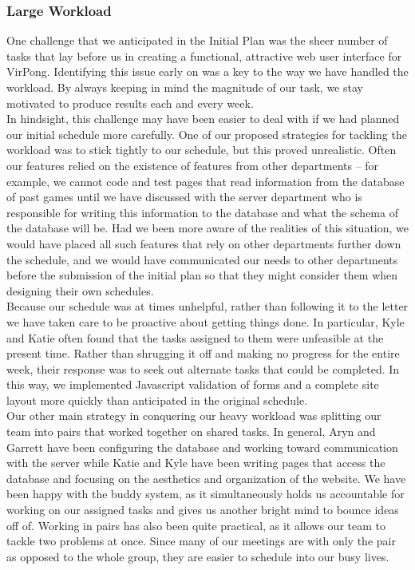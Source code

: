 		\subsubsection{Large Workload}
			One challenge that we anticipated in the Initial Plan was the sheer number of tasks that lay before us in creating a functional, attractive web user interface for VirPong. Identifying this issue early on was a key to the way we have handled the workload. By always keeping in mind the magnitude of our task, we stay motivated to produce results each and every week.\\In hindsight, this challenge may have been easier to deal with if we had planned our initial schedule more carefully. One of our proposed strategies for tackling the workload was to stick tightly to our schedule, but this proved unrealistic. Often our features relied on the existence of features from other departments -- for example, we cannot code and test pages that read information from the database of past games until we have discussed with the server department who is responsible for writing this information to the database and what the schema of the database will be. Had we been more aware of the realities of this situation, we would have placed all such features that rely on other departments further down the schedule, and we would have communicated our needs to other departments before the submission of the initial plan so that they might consider them when designing their own schedules.\\Because our schedule was at times unhelpful, rather than following it to the letter we have taken care to be proactive about getting things done. In particular, Kyle and Katie often found that the tasks assigned to them were unfeasible at the present time. Rather than shrugging it off and making no progress for the entire week, their response was to seek out alternate tasks that could be completed. In this way, we implemented Javascript validation of forms and a complete site layout more quickly than anticipated in the original schedule.\\Our other main strategy in conquering our heavy workload was splitting our team into pairs that worked together on shared tasks. In general, Aryn and Garrett have been configuring the database and working toward communication with the server while Katie and Kyle have been writing pages that access the database and focusing on the aesthetics and organization of the website. We have been happy with the buddy system, as it simultaneously holds us accountable for working on our assigned tasks and gives us another bright mind to bounce ideas off of. Working in pairs has also been quite practical, as it allows our team to tackle two problems at once. Since many of our meetings are with only the pair as opposed to the whole group, they are easier to schedule into our busy lives.

\newpage